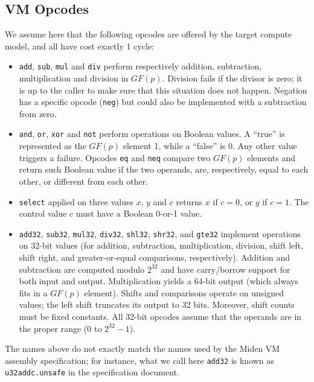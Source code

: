 \documentclass{llncs}
\newcommand{\GF}{GF}
\begin{document}
\subsection{VM Opcodes}

We assume here that the following opcodes are offered by the target
compute model, and all have cost exactly 1 cycle:
\begin{itemize}

    \item \verb+add+, \verb+sub+, \verb+mul+ and \verb+div+ perform
    respectively addition, subtraction, multiplication and division
    in $\GF(p)$. Division fails if the divisor is zero; it is up to
    the caller to make sure that this situation does not happen.
    Negation has a specific opcode (\verb+neg+) but could also be
    implemented with a subtraction from zero.

    \item \verb+and+, \verb+or+, \verb+xor+ and \verb+not+ perform
    operations on Boolean values. A ``true'' is represented as the
    $\GF(p)$ element 1, while a ``false'' is 0. Any other value triggers
    a failure. Opcodes \verb+eq+ and \verb+neq+ compare two $\GF(p)$
    elements and return such Boolean value if the two operands, are,
    respectively, equal to each other, or different from each other.

    \item \verb+select+ applied on three values $x$, $y$ and $c$
    returns $x$ if $c = 0$, or $y$ if $c = 1$. The control value $c$
    must have a Boolean 0-or-1 value.

    \item \verb+add32+, \verb+sub32+, \verb+mul32+, \verb+div32+,
    \verb+shl32+, \verb+shr32+, and \verb+gte32+ implement operations on
    32-bit values (for addition, subtraction, multiplication, division,
    shift left, shift right, and greater-or-equal comparisons,
    respectively). Addition and subtraction are computed modulo $2^{32}$
    and have carry/borrow support for both input and output.
    Multiplication yields a 64-bit output (which always fits in a
    $\GF(p)$ element). Shifts and comparisons operate on unsigned
    values; the left shift truncates its output to 32 bits. Moreover,
    shift counts must be fixed constants. All 32-bit opcodes assume that
    the operands are in the proper range (0 to $2^{32}-1$).

\end{itemize}

The names above do not exactly match the names used by the Miden VM
assembly spe\-cification\cite{MidenAsm}; for instance, what we call here
\verb+add32+ is known as \verb+u32addc.unsafe+ in the specification
document.
\end{document}
